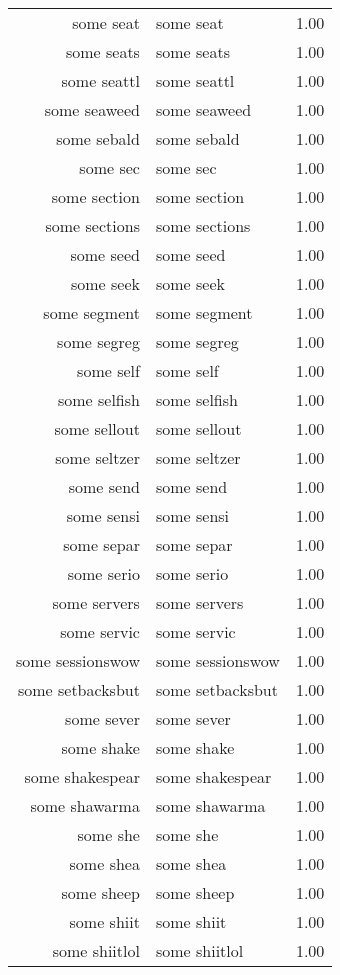 \begin{table}[ht]
\begin{tabular}{rlr}
  some seat & some seat & 1.00 \\ 
  some seats & some seats & 1.00 \\ 
  some seattl & some seattl & 1.00 \\ 
  some seaweed & some seaweed & 1.00 \\ 
  some sebald & some sebald & 1.00 \\ 
  some sec & some sec & 1.00 \\ 
  some section & some section & 1.00 \\ 
  some sections & some sections & 1.00 \\ 
  some seed & some seed & 1.00 \\ 
  some seek & some seek & 1.00 \\ 
  some segment & some segment & 1.00 \\ 
  some segreg & some segreg & 1.00 \\ 
  some self & some self & 1.00 \\ 
  some selfish & some selfish & 1.00 \\ 
  some sellout & some sellout & 1.00 \\ 
  some seltzer & some seltzer & 1.00 \\ 
  some send & some send & 1.00 \\ 
  some sensi & some sensi & 1.00 \\ 
  some separ & some separ & 1.00 \\ 
  some serio & some serio & 1.00 \\ 
  some servers & some servers & 1.00 \\ 
  some servic & some servic & 1.00 \\ 
  some sessionswow & some sessionswow & 1.00 \\ 
  some setbacksbut & some setbacksbut & 1.00 \\ 
  some sever & some sever & 1.00 \\ 
  some shake & some shake & 1.00 \\ 
  some shakespear & some shakespear & 1.00 \\ 
  some shawarma & some shawarma & 1.00 \\ 
  some she & some she & 1.00 \\ 
  some shea & some shea & 1.00 \\ 
  some sheep & some sheep & 1.00 \\ 
  some shiit & some shiit & 1.00 \\ 
  some shiitlol & some shiitlol & 1.00 \\ 

\end{tabular}
\end{table}
